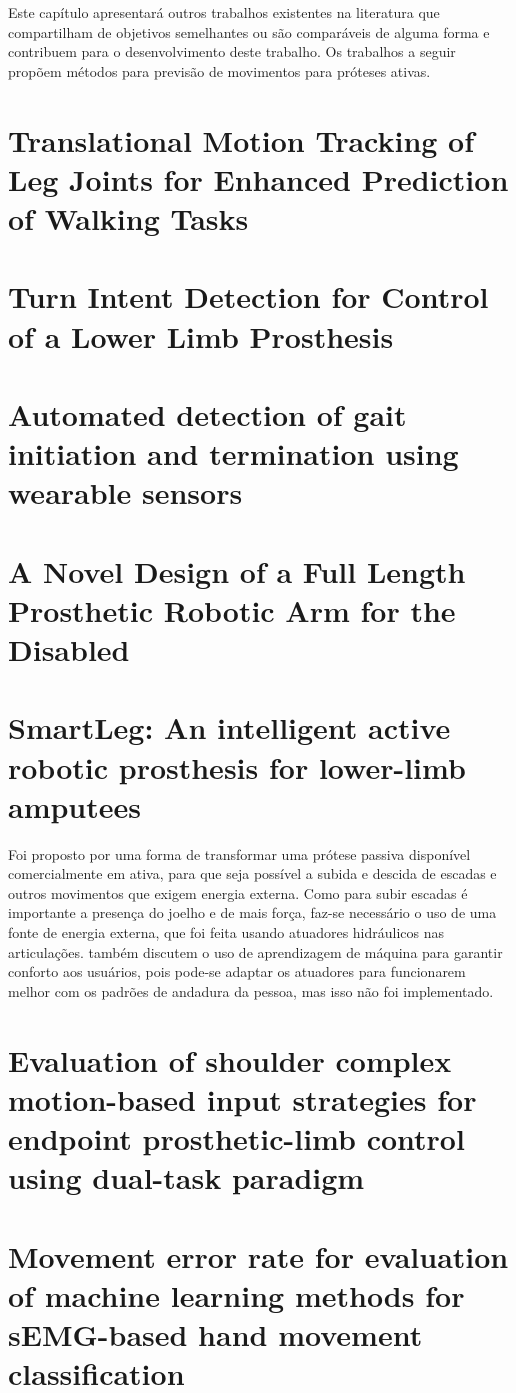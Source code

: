 Este capítulo apresentará outros trabalhos existentes na literatura que compartilham de objetivos semelhantes ou são comparáveis de alguma forma e contribuem para o desenvolvimento deste trabalho. Os trabalhos a seguir propõem métodos para previsão de movimentos para próteses ativas.

\section{Translational Motion Tracking of Leg Joints for Enhanced Prediction of Walking Tasks}
\cite{stolyarov:2017}

\section{Turn Intent Detection for Control of a Lower Limb Prosthesis}
\cite{pew:2017}

\section{Automated detection of gait initiation and termination using wearable sensors}
\cite{novak:2013Automated}

\section{A Novel Design of a Full Length Prosthetic Robotic Arm for the Disabled}
\cite{kumar:2017}

\section{SmartLeg: An intelligent active robotic prosthesis for lower-limb amputees}
Foi proposto por  uma forma de transformar uma prótese passiva disponível comercialmente em ativa, para que seja possível a subida e descida de escadas e outros movimentos que exigem energia externa. Como para subir escadas é importante a presença do joelho e de mais força, faz-se necessário o uso de uma fonte de energia externa, que foi feita usando atuadores hidráulicos nas articulações.  também discutem o uso de aprendizagem de máquina para garantir conforto aos usuários, pois pode-se adaptar os atuadores para funcionarem melhor com os padrões de andadura da pessoa, mas isso não foi implementado.

\section{Evaluation of shoulder complex motion-based input strategies for endpoint prosthetic-limb control using dual-task paradigm}
\cite{losier:2011}

\section{Movement error rate for evaluation of machine learning methods for sEMG-based hand movement classification}
\cite{gijsberts:2014}

